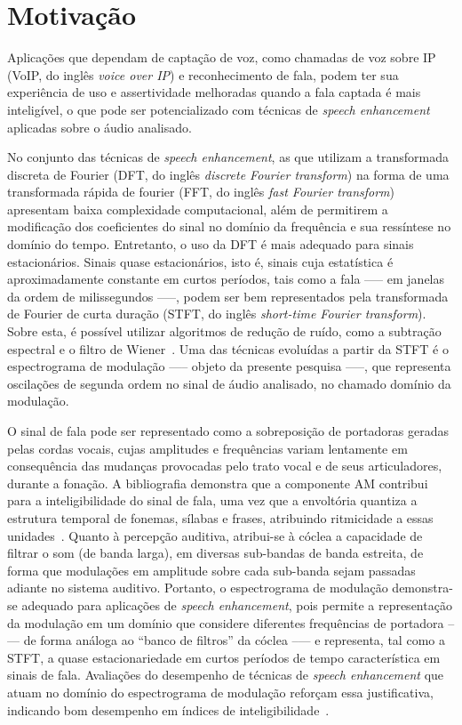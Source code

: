 \section{Motivação}

Aplicações que dependam de captação de voz, como chamadas de voz sobre IP (VoIP,
 do inglês \textit{voice over IP}) e reconhecimento de fala, podem ter sua
 experiência de uso e assertividade melhoradas quando a fala captada é mais
 inteligível, o que pode ser potencializado com técnicas de \textit{speech
 enhancement} aplicadas sobre o áudio analisado.

No conjunto das técnicas de \textit{speech enhancement}, as que utilizam a
transformada discreta de Fourier (DFT, do inglês \textit{discrete Fourier
transform}) na forma de uma transformada rápida de fourier (FFT, do inglês
\textit{fast Fourier transform}) apresentam baixa complexidade computacional,
além de permitirem a modificação dos coeficientes do sinal no domínio da
frequência e sua ressíntese no domínio do tempo. Entretanto, o uso da DFT é mais
adequado para sinais estacionários. Sinais quase estacionários, isto é, sinais
cuja estatística é aproximadamente constante em curtos períodos, tais como a
fala —-- em janelas da ordem de milissegundos —--, podem ser bem representados
pela transformada de Fourier de curta duração (STFT, do inglês
\textit{short-time Fourier transform}). Sobre esta, é possível utilizar
algoritmos de redução de ruído, como a subtração espectral e o filtro de
Wiener~\cite{parchami2016}. Uma das técnicas evoluídas a partir da STFT é o
espectrograma de modulação —-- objeto da presente pesquisa —--, que representa
oscilações de segunda ordem no sinal de áudio analisado, no chamado domínio da
modulação.

O sinal de fala pode ser representado como a sobreposição de portadoras geradas
pelas cordas vocais, cujas amplitudes e frequências variam lentamente em
consequência das mudanças provocadas pelo trato vocal e de seus articuladores,
durante a fonação. A bibliografia demonstra que a componente AM contribui para a
inteligibilidade do sinal de fala, uma vez que a envoltória quantiza a estrutura
temporal de fonemas, sílabas e frases, atribuindo ritmicidade a essas
unidades~\cite{poeppel2020,varnet2017}. Quanto à percepção auditiva, atribui-se
à cóclea a capacidade de filtrar o som (de banda larga), em diversas sub-bandas
de banda estreita, de forma que modulações em amplitude sobre cada sub-banda
sejam passadas adiante no sistema auditivo. Portanto, o espectrograma de
modulação demonstra-se adequado para aplicações de \textit{speech enhancement},
pois permite a representação da modulação em um domínio que considere diferentes
frequências de portadora --— de forma análoga ao ``banco de filtros'' da cóclea
--— e representa, tal como a STFT, a quase estacionariedade em curtos períodos
de tempo característica em sinais de fala. Avaliações do desempenho de técnicas
de \textit{speech enhancement} que atuam no domínio do espectrograma de
modulação reforçam essa justificativa, indicando bom desempenho em índices de
inteligibilidade~\cite{schwerin2018}.

